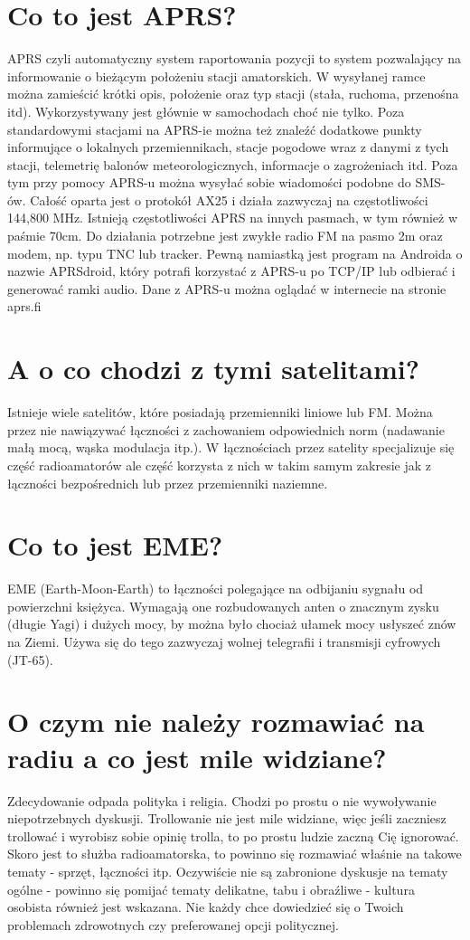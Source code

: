 \documentclass[a4paper,12pt]{article}
\begin{document}
\section{Co to jest APRS?}
APRS czyli automatyczny system raportowania pozycji to system pozwalający na informowanie o bieżącym położeniu stacji amatorskich. W wysyłanej ramce można zamieścić krótki opis, położenie oraz typ stacji (stała, ruchoma, przenośna itd). Wykorzystywany jest głównie w samochodach choć nie tylko. Poza standardowymi stacjami na APRS-ie można też znaleźć dodatkowe punkty informujące o lokalnych przemiennikach, stacje pogodowe wraz z danymi z tych stacji, telemetrię balonów meteorologicznych, informacje o zagrożeniach itd. 
Poza tym przy pomocy APRS-u można wysyłać sobie wiadomości podobne do SMS-ów.
Całość oparta jest o protokół AX25 i działa zazwyczaj na częstotliwości 144,800 MHz. Istnieją częstotliwości APRS na innych pasmach, w tym również w paśmie 70cm.
Do działania potrzebne jest zwykłe radio FM na pasmo 2m oraz modem, np. typu TNC lub tracker. 
Pewną namiastką jest program na Androida o nazwie APRSdroid, który potrafi korzystać z APRS-u po TCP/IP lub odbierać i generować ramki audio.
Dane z APRS-u można oglądać w internecie na stronie aprs.fi

\section{A o co chodzi z tymi satelitami?}
Istnieje wiele satelitów, które posiadają przemienniki liniowe lub FM. Można przez nie nawiązywać łączności z zachowaniem odpowiednich norm (nadawanie małą mocą, wąska modulacja itp.). W łącznościach przez satelity specjalizuje się część radioamatorów ale część korzysta z nich w takim samym zakresie jak z łączności bezpośrednich lub przez przemienniki naziemne.

\section{Co to jest EME?}
EME (Earth-Moon-Earth) to łączności polegające na odbijaniu sygnału od powierzchni księżyca. Wymagają one rozbudowanych anten o znacznym zysku (długie Yagi) i dużych mocy, by można było chociaż ułamek mocy usłyszeć znów na Ziemi. Używa się do tego zazwyczaj wolnej telegrafii i transmisji cyfrowych (JT-65).

\section{O czym nie należy rozmawiać na radiu a co jest mile widziane?}
Zdecydowanie odpada polityka i religia. Chodzi po prostu o nie wywoływanie niepotrzebnych dyskusji. Trollowanie nie jest mile widziane, więc jeśli zaczniesz trollować i wyrobisz sobie opinię trolla, to po prostu ludzie zaczną Cię ignorować.
Skoro jest to służba radioamatorska, to powinno się rozmawiać właśnie na takowe tematy - sprzęt, łączności itp. Oczywiście nie są zabronione dyskusje na tematy ogólne - powinno się pomijać tematy delikatne, tabu i obraźliwe - kultura osobista również jest wskazana. Nie każdy chce dowiedzieć się o Twoich problemach zdrowotnych czy preferowanej opcji politycznej.
\end{document}
